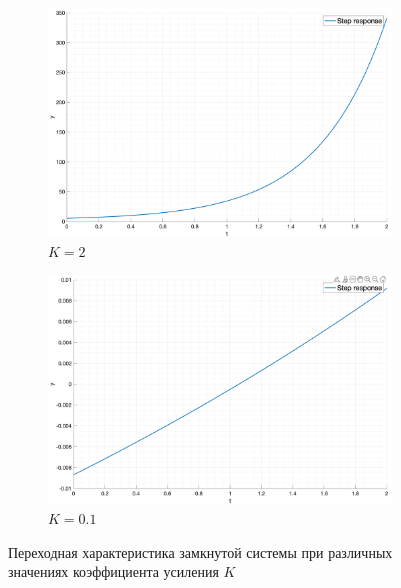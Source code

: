 \begin{figure}[ht!]
\begin{subfigure}{0.5\textwidth}
        \includegraphics[width=\textwidth]{media/plots/task5_step_response_closed_3.png}
        \caption{$K = 2$}
    \end{subfigure}
    \begin{subfigure}{0.5\textwidth}
        \centering
        \includegraphics[width=\textwidth]{media/plots/task5_step_response_closed_4.png}
        \caption{$K = 0.1$}
    \end{subfigure}
    \caption{Переходная характеристика замкнутой системы при различных значениях коэффициента усиления $K$}
    \label{fig:task5_step}
\end{figure}

